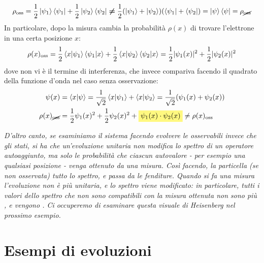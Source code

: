 \documentclass[../../FisicaTeorica.tex]{subfiles}
\begin{document}
\[
\rho_{\text{oss}}=
\frac{1}{2}\ket{\psi_1}\bra{\psi_1}+\frac{1}{2}\ket{\psi_2}\bra{\psi_2} \bm{\neq} \frac{1}{2}(\ket{\psi_1}+\ket{\psi_2})(\bra{\psi_1}+\bra{\psi_2})=\ket{\psi}\bra{\psi} = \rho_{\cancel{\text{oss}}}
\]
In particolare, dopo la misura cambia la probabilità $\rho(x)$ di trovare l'elettrone in una certa posizione $x$:
\[
\rho(x)_{\text{oss}}=\frac{1}{2}\braket{x|\psi_1}\braket{\psi_1|x}+\frac{1}{2}\braket{x|\psi_2}\braket{\psi_2|x}=\frac{1}{2}|\psi_1(x)|^2+\frac{1}{2}|\psi_2(x)|^2
\]
dove non vi è il termine di interferenza, che invece compariva facendo il quadrato della funzione d'onda nel caso senza osservazione:
\begin{align*}
\psi(x)&=\braket{x|\psi}=\frac{1}{\sqrt{2}}\braket{x|\psi_1}+\braket{x|\psi_2}=\frac{1}{\sqrt{2}}(\psi_1(x)+\psi_2(x))\\
\rho(x)_{\cancel{\text{oss}}} &= \frac{1}{2}\psi_1(x)^2 + \frac{1}{2}\psi_2(x)^2 + \hlc{Yellow}{\psi_1(x)\cdot \psi_2(x)} \neq \rho(x)_{\text{oss}}
\end{align*}

\textit{D'altro canto, se esaminiamo il sistema facendo evolvere le osservabili invece che gli stati, si ha che un'evoluzione unitaria non modifica lo spettro di un operatore autoaggiunto, ma solo le probabilità che ciascun autovalore - per esempio una qualsiasi posizione - venga ottenuto da una misura. Così facendo, la particella (se non osservata)  tutto lo spettro, e passa da  le fenditure. Quando si fa una misura l'evoluzione non è più unitaria, e lo spettro viene modificato: in particolare, tutti i valori dello spettro che non sono compatibili con la misura ottenuta non sono più , e vengono . Ci occuperemo di esaminare questa visuale di Heisenberg nel prossimo esempio.}

\section{Esempi di evoluzioni}
\end{document}
